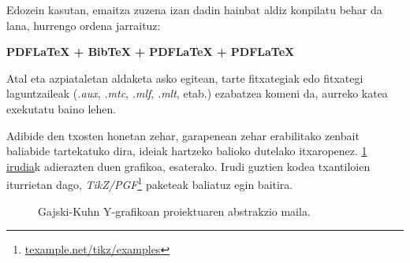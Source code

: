Edozein kasutan, emaitza zuzena izan dadin hainbat aldiz konpilatu behar da lana, hurrengo ordena jarraituz:

\begin{center}
\Large\bfseries
PDFLaTeX + BibTeX + PDFLaTeX + PDFLaTeX
\end{center}

Atal eta azpiataletan aldaketa asko egitean, tarte fitxategiak edo fitxategi laguntzaileak (\emph{.aux}, \emph{.mtc}, \emph{.mlf}, \emph{.mlt}, etab.) ezabatzea komeni da, aurreko katea exekutatu baino lehen.

\bigskip

Adibide den txosten honetan zehar, garapenean zehar erabilitako zenbait baliabide tartekatuko dira, ideiak hartzeko balioko dutelako itxaropenez. \hyperref[fig:ychart]{\ref*{fig:ychart} irudia}k adierazten duen grafikoa, esaterako. Irudi guztien kodea txantiloien iturrietan dago, \emph{TikZ/PGF}\footnote{\url{texample.net/tikz/examples}} paketeak baliatuz egin baitira.

\begin{figure}[!htp]
\centering

\caption{Gajski-Kuhn Y-grafikoan proiektuaren abstrakzio maila.} 
\label{fig:ychart}
\end{figure}